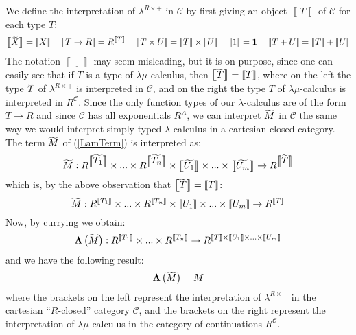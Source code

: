 \documentclass{CSML}
\renewcommand{\ldots}{...}
\newcommand*\LmSortBase{X}
\newcommand*\LmSortA{T}
\newcommand*\LmSortB{U}
\newcommand*\LmTermA{M}
\newcommand*\Lam{\lambda^{R\times+}}
\newcommand*\LamTypeTo\to
\newcommand*\LamTypeTimes\times
\newcommand*\LamTypePlus{+}
\newcommand*\LamTypeUnit{1}
\newcommand*\LamTypeR{R}
\newcommand*\LamTypeA{T}
\newcommand*\LamTypeB{U}
\newcommand*\LamCPS[1]{\raisebox{0pt}[.9\height]{$\widetilde{\raisebox{0pt}[.9\height]{$#1$}}$}}
\newcommand*\CatC{\mathcal{C}}
\newcommand*\CatObjA{A}
\newcommand*\CatR{R}
\newcommand*\CatRC{\CatExp{\CatR}{\CatC}}
\newcommand*\CatTimes\times
\newcommand*\CatPlus{+}
\newcommand*\CatExp[2]{#1^{#2}}
\newcommand*\CatLambda{\bm{\Lambda}}
\newcommand*\CatTerm{\mathbf{1}}
\newcommand*\CatInterpSortNeg[1]{{\left\llbracket#1\right\rrbracket}}
\begin{document}
We define the interpretation of $\Lam$ in $\CatC$ by first giving an object $\CatInterpSortNeg{\LamTypeA}$ of $\CatC$ for each type $\LamTypeA$:
$$\CatInterpSortNeg{\LamCPS{\LmSortBase}}=\CatInterpSortNeg{\LmSortBase}\;\quad\CatInterpSortNeg{\LamTypeA\LamTypeTo\LamTypeR}=\CatExp{\CatR}{\CatInterpSortNeg{\LamTypeA}}\;\quad\CatInterpSortNeg{\LamTypeA\LamTypeTimes\LamTypeB}=\CatInterpSortNeg{\LamTypeA}\LamTypeTimes\CatInterpSortNeg{\LamTypeB}\;\quad\CatInterpSortNeg{\LamTypeUnit}=\CatTerm\;\quad\CatInterpSortNeg{\LamTypeA\LamTypePlus\LamTypeB}=\CatInterpSortNeg{\LamTypeA}\CatPlus\CatInterpSortNeg{\LamTypeB}$$
The notation $\CatInterpSortNeg{\,\underline{\ \ }\,}$ may seem misleading, but it is on purpose, since one can easily see that if $\LmSortA$ is a type of $\lambda\mu$-calculus, then $\CatInterpSortNeg{\LamCPS{\LmSortA}}=\CatInterpSortNeg{\LmSortA}$, where on the left the type $\LamCPS{\LmSortA}$ of $\Lam$ is interpreted in $\CatC$, and on the right the type $\LmSortA$ of $\lambda\mu$-calculus is interpreted in $\CatRC$. Since the only function types of our $\lambda$-calculus are of the form $\LamTypeA\LamTypeTo\LamTypeR$ and since $\CatC$ has all exponentials $\CatExp{\CatR}{\CatObjA}$, we can interpret $\LamCPS{\LmTermA}$ in $\CatC$ the same way we would interpret simply typed $\lambda$-calculus in a cartesian closed category. The term $\LamCPS{\LmTermA}$ of (\ref{LamTerm}) is interpreted as:
$$\LamCPS{\LmTermA}:\CatExp{\CatR}{\CatInterpSortNeg{\LamCPS{\LmSortA_1}}}\CatTimes\ldots\CatTimes\CatExp{\CatR}{\CatInterpSortNeg{\LamCPS{\LmSortA_n}}}\CatTimes\CatInterpSortNeg{\LamCPS{\LmSortB_1}}\CatTimes\ldots\CatTimes\CatInterpSortNeg{\LamCPS{\LmSortB_m}}\to\CatExp{\CatR}{\CatInterpSortNeg{\LamCPS{\LmSortA}}}$$
which is, by the above observation that $\CatInterpSortNeg{\LamCPS{\LmSortA}}=\CatInterpSortNeg{\LmSortA}$:
$$\LamCPS{\LmTermA}:\CatExp{\CatR}{\CatInterpSortNeg{\LmSortA_1}}\CatTimes\ldots\CatTimes\CatExp{\CatR}{\CatInterpSortNeg{\LmSortA_n}}\CatTimes\CatInterpSortNeg{\LmSortB_1}\CatTimes\ldots\CatTimes\CatInterpSortNeg{\LmSortB_m}\to\CatExp{\CatR}{\CatInterpSortNeg{\LmSortA}}$$
Now, by currying we obtain:
$$\CatLambda\left(\LamCPS{\LmTermA}\right):\CatExp{\CatR}{\CatInterpSortNeg{\LmSortA_1}}\CatTimes\ldots\CatTimes\CatExp{\CatR}{\CatInterpSortNeg{\LmSortA_n}}\to\CatExp{\CatR}{\CatInterpSortNeg{\LmSortA}\CatTimes\CatInterpSortNeg{\LmSortB_1}\CatTimes\ldots\CatTimes\CatInterpSortNeg{\LmSortB_m}}$$
and we have the following result:
$$\CatLambda\left(\LamCPS{\LmTermA}\right)=\LmTermA$$
where the brackets on the left represent the interpretation of $\Lam$ in the cartesian ``$\CatR$-closed'' category $\CatC$, and the brackets on the right represent the interpretation of $\lambda\mu$-calculus in the category of continuations $\CatRC$.\par
\end{document}
